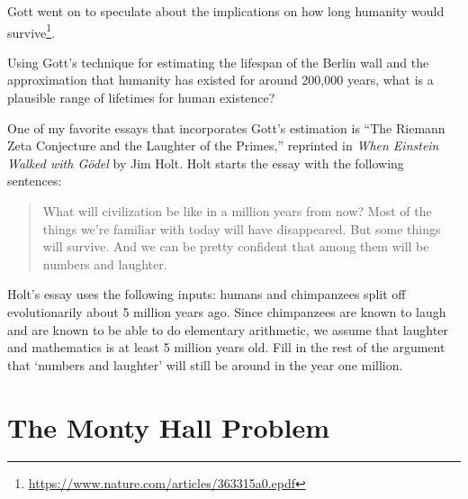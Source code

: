 Gott went on to speculate about the implications on how long humanity would survive\footnote{\url{https://www.nature.com/articles/363315a0.epdf}}.
\begin{exercise}
Using Gott's technique for estimating the lifespan of the Berlin wall and the approximation that humanity has existed for around 200,000 years, what is a plausible range of lifetimes for human existence?
\end{exercise}
One of my favorite essays that incorporates Gott's estimation is ``The Riemann Zeta Conjecture and the Laughter of the Primes,'' reprinted in \emph{When Einstein Walked with G\"odel} by Jim Holt. Holt starts the essay with the following sentences:
\begin{quote}
	What will civilization be like in a million years from now? Most of the things we're familiar with today will have disappeared. But some things will survive. And we can be pretty confident that among them will be numbers and laughter.
\end{quote}
\begin{exercise}
Holt's essay uses the following inputs: humans and chimpanzees split off evolutionarily about 5 million years ago. Since chimpanzees are known to laugh and are known to be able to do elementary arithmetic, we assume that laughter and mathematics is at least 5 million years old. Fill in the rest of the argument that `numbers and laughter' will still be around in the year one million.
\end{exercise}

\section{The Monty Hall Problem}

